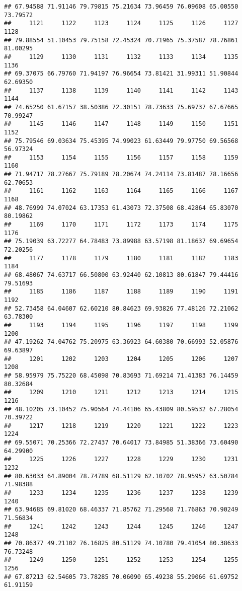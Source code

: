 \documentclass[
]{article}
\begin{document}
\begin{verbatim}
## 67.94588 71.91146 79.79815 75.21634 73.96459 76.09608 65.00550 73.79572 
##     1121     1122     1123     1124     1125     1126     1127     1128 
## 79.88554 51.10453 79.75158 72.45324 70.71965 75.37587 78.76861 81.00295 
##     1129     1130     1131     1132     1133     1134     1135     1136 
## 69.37075 66.79760 71.94197 76.96654 73.81421 31.99311 51.90844 62.69350 
##     1137     1138     1139     1140     1141     1142     1143     1144 
## 74.65250 61.67157 38.50386 72.30151 78.73633 75.69737 67.67665 70.99247 
##     1145     1146     1147     1148     1149     1150     1151     1152 
## 75.79546 69.03634 75.45395 74.99023 61.63449 79.97750 69.56568 56.97324 
##     1153     1154     1155     1156     1157     1158     1159     1160 
## 71.94717 78.27667 75.79189 78.20674 74.24114 73.81487 78.16656 62.70653 
##     1161     1162     1163     1164     1165     1166     1167     1168 
## 48.76999 74.07024 63.17353 61.43073 72.37508 68.42864 65.83070 80.19862 
##     1169     1170     1171     1172     1173     1174     1175     1176 
## 75.19039 63.72277 64.78483 73.89988 63.57198 81.18637 69.69654 72.20256 
##     1177     1178     1179     1180     1181     1182     1183     1184 
## 68.48067 74.63717 66.50800 63.92440 62.10813 80.61847 79.44416 79.51693 
##     1185     1186     1187     1188     1189     1190     1191     1192 
## 52.73458 64.04607 62.60210 80.84623 69.93826 77.48126 72.21062 63.78300 
##     1193     1194     1195     1196     1197     1198     1199     1200 
## 47.19262 74.04762 75.20975 63.36923 64.60380 70.66993 52.05876 69.63897 
##     1201     1202     1203     1204     1205     1206     1207     1208 
## 58.95979 75.75220 68.45098 70.83693 71.69214 71.41383 76.14459 80.32684 
##     1209     1210     1211     1212     1213     1214     1215     1216 
## 48.10205 73.10452 75.90564 74.44106 65.43809 80.59532 67.28054 70.39722 
##     1217     1218     1219     1220     1221     1222     1223     1224 
## 69.55071 70.25366 72.27437 70.64017 73.84985 51.38366 73.60490 64.29900 
##     1225     1226     1227     1228     1229     1230     1231     1232 
## 80.63033 64.89004 78.74789 68.51129 62.10702 78.95957 63.50784 71.98388 
##     1233     1234     1235     1236     1237     1238     1239     1240 
## 63.94685 69.81020 68.46337 71.85762 71.29568 71.76863 70.90249 71.56834 
##     1241     1242     1243     1244     1245     1246     1247     1248 
## 70.86377 49.21102 76.16825 80.51129 74.10780 79.41054 80.38633 76.73248 
##     1249     1250     1251     1252     1253     1254     1255     1256 
## 67.87213 62.54605 73.78285 70.06090 65.49238 55.29066 61.69752 61.91159 

\end{verbatim}
\end{document}
